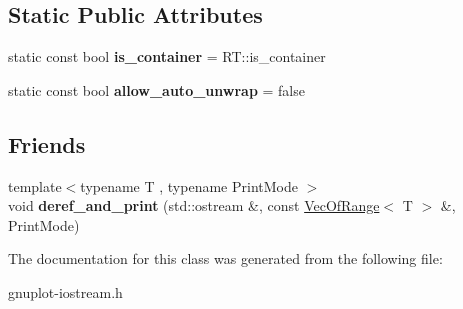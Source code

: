 \subsection*{Static Public Attributes}
\begin{DoxyCompactItemize}
\item 
\mbox{\label{classgnuplotio_1_1VecOfRange_a8725d4907d46575dddb7152f1f1d1f66}} 
static const bool {\bfseries is\+\_\+container} = R\+T\+::is\+\_\+container
\item 
\mbox{\label{classgnuplotio_1_1VecOfRange_a19d87e61a7854f9e22d3dd8a94f79500}} 
static const bool {\bfseries allow\+\_\+auto\+\_\+unwrap} = false
\end{DoxyCompactItemize}
\subsection*{Friends}
\begin{DoxyCompactItemize}
\item 
\mbox{\label{classgnuplotio_1_1VecOfRange_adafbfb0122b8e499d1af9c246f4ac288}} 
{\footnotesize template$<$typename T , typename Print\+Mode $>$ }\\void {\bfseries deref\+\_\+and\+\_\+print} (std\+::ostream \&, const \hyperlink{classgnuplotio_1_1VecOfRange}{Vec\+Of\+Range}$<$ T $>$ \&, Print\+Mode)
\end{DoxyCompactItemize}


The documentation for this class was generated from the following file\+:\begin{DoxyCompactItemize}
\item 
gnuplot-\/iostream.\+h\end{DoxyCompactItemize}
